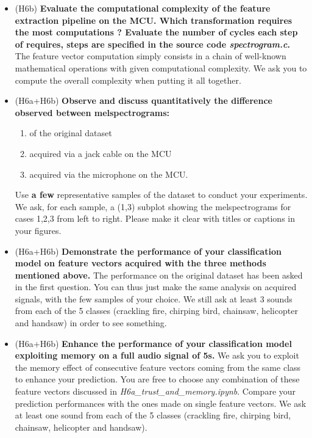 \begin{itemize}
    \item (H6b) \textbf{Evaluate the computational complexity of the feature extraction pipeline on the MCU. Which transformation requires the most computations ? Evaluate the number of cycles each step of requires, steps are specified in the source code \emph{spectrogram.c}.} \\
The feature vector computation simply consists in a chain of well-known mathematical operations with given computational complexity. We ask you to compute the overall complexity when putting it all together.
\item (H6a+H6b) \textbf{Observe and discuss quantitatively the difference observed between melspectrograms:}
\begin{enumerate}
    \item of the original dataset
    \item acquired via a jack cable on the MCU
    \item acquired via the microphone on the MCU.
   \end{enumerate}
     Use \textbf{a few} representative samples of the dataset to conduct your experiments.
       We ask, for each sample, a (1,3) subplot showing the melspectrograms for cases 1,2,3 from left to right. Please make it clear with titles or captions in your figures.
    \item (H6a+H6b) \textbf{Demonstrate the performance of your classification model on feature vectors acquired with the three methods mentioned above.}
    The performance on the original dataset has been asked in the first question. You can thus just make the same analysis on acquired signals, with the few samples of your choice. We still ask at least 3 sounds from each of the 5 classes (crackling fire, chirping bird, chainsaw, helicopter and handsaw) in order to see something.
    \item (H6a+H6b) \textbf{Enhance the performance of your classification model exploiting memory on a full audio signal of 5s.}
    We ask you to exploit the memory effect of consecutive feature vectors coming from the same class to enhance your prediction. You are free to choose any combination of these feature vectors discussed in \emph{H6a\_trust\_and\_memory.ipynb}. Compare your prediction performances with the ones made on single feature vectors. We ask at least one sound from each of the 5 classes (crackling fire, chirping bird, chainsaw, helicopter and handsaw).
\end{itemize}
